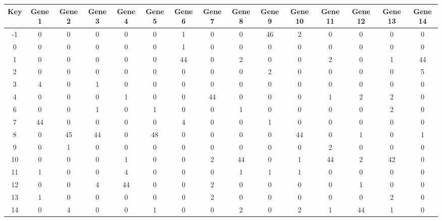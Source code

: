 \begin{tabular}{|c|c|c|c|c|c|c|c|c|c|c|c|c|c|c|}
\hline
Key & Gene 1 & Gene 2 & Gene 3 & Gene 4 & Gene 5 & Gene 6 & Gene 7 & Gene 8 & Gene 9 & Gene 10 & Gene 11 & Gene 12 & Gene 13 & Gene 14 \\
\hline
-1 & 0 & 0 & 0 & 0 & 0 & 1 & 0 & 0 & 46 & 2 & 0 & 0 & 0 & 0 \\
0 & 0 & 0 & 0 & 0 & 0 & 1 & 0 & 0 & 0 & 0 & 0 & 0 & 0 & 0 \\
1 & 0 & 0 & 0 & 0 & 0 & 44 & 0 & 2 & 0 & 0 & 2 & 0 & 1 & 44 \\
2 & 0 & 0 & 0 & 0 & 0 & 0 & 0 & 0 & 2 & 0 & 0 & 0 & 0 & 5 \\
3 & 4 & 0 & 1 & 0 & 0 & 0 & 0 & 0 & 0 & 0 & 0 & 0 & 0 & 0 \\
4 & 0 & 0 & 0 & 1 & 0 & 0 & 44 & 0 & 0 & 0 & 1 & 2 & 2 & 0 \\
6 & 0 & 0 & 1 & 0 & 1 & 0 & 0 & 1 & 0 & 0 & 0 & 0 & 2 & 0 \\
7 & 44 & 0 & 0 & 0 & 0 & 4 & 0 & 0 & 1 & 0 & 0 & 0 & 0 & 0 \\
8 & 0 & 45 & 44 & 0 & 48 & 0 & 0 & 0 & 0 & 44 & 0 & 1 & 0 & 1 \\
9 & 0 & 1 & 0 & 0 & 0 & 0 & 0 & 0 & 0 & 0 & 2 & 0 & 0 & 0 \\
10 & 0 & 0 & 0 & 1 & 0 & 0 & 2 & 44 & 0 & 1 & 44 & 2 & 42 & 0 \\
11 & 1 & 0 & 0 & 4 & 0 & 0 & 0 & 1 & 1 & 1 & 0 & 0 & 0 & 0 \\
12 & 0 & 0 & 4 & 44 & 0 & 0 & 2 & 0 & 0 & 0 & 0 & 1 & 0 & 0 \\
13 & 1 & 0 & 0 & 0 & 0 & 0 & 2 & 0 & 0 & 0 & 0 & 0 & 2 & 0 \\
14 & 0 & 4 & 0 & 0 & 1 & 0 & 0 & 2 & 0 & 2 & 1 & 44 & 1 & 0 \\
\hline
\end{tabular}